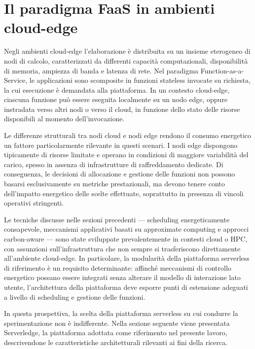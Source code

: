 \section{Il paradigma FaaS in ambienti cloud-edge}
\label{sec:faas_cloud_edge}

Negli ambienti cloud-edge l'elaborazione è distribuita su un insieme
eterogeneo di nodi di calcolo, caratterizzati da differenti capacità
computazionali, disponibilità di memoria, ampiezza di banda e latenza
di rete. Nel paradigma Function-as-a-Service, le applicazioni sono
scomposite in funzioni stateless invocate su richiesta, la cui
esecuzione è demandata alla piattaforma. In un contesto cloud-edge,
ciascuna funzione può essere eseguita localmente su un nodo edge,
oppure instradata verso altri nodi o verso il cloud, in funzione
dello stato delle risorse disponibili al momento dell'invocazione.

Le differenze strutturali tra nodi cloud e nodi edge rendono il
consumo energetico un fattore particolarmente rilevante in questi
scenari. I nodi edge dispongono tipicamente di risorse limitate e
operano in condizioni di maggiore variabilità del carico, spesso
in assenza di infrastrutture di raffreddamento dedicate. Di
conseguenza, le decisioni di allocazione e gestione delle funzioni
non possono basarsi esclusivamente su metriche prestazionali, ma
devono tenere conto dell'impatto energetico delle scelte effettuate,
soprattutto in presenza di vincoli operativi stringenti.

Le tecniche discusse nelle sezioni precedenti — scheduling
energeticamente consapevole, meccanismi applicativi basati su approximate
computing e approcci carbon-aware — sono state sviluppate prevalentemente
in contesti cloud o HPC, con assunzioni sull'infrastruttura che non
sempre si trasferiscono direttamente all'ambiente cloud-edge. In
particolare, la modularità della piattaforma serverless di riferimento
è un requisito determinante: affinché meccanismi di controllo
energetico possano essere integrati senza alterare il modello di
interazione lato utente, l'architettura della piattaforma deve
esporre punti di estensione adeguati a livello di scheduling e
gestione delle funzioni.

In questa prospettiva, la scelta della piattaforma serverless su
cui condurre la sperimentazione non è indifferente. Nella sezione
seguente viene presentata Serverledge, la piattaforma adottata come
riferimento nel presente lavoro, descrivendone le caratteristiche
architetturali rilevanti ai fini della ricerca.

